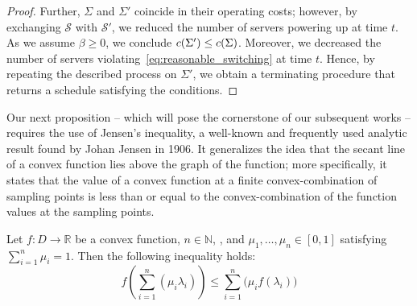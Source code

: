 \begin{proof}
Further, $\Sigma$ and $\Sigma'$ coincide in their operating costs; however, by exchanging $\mathcal{S}$ with $\mathcal{S}'$, we reduced the number of servers powering up at time $t$. As we assume $\beta\ge0$, we conclude $c(\Sigma')\le c(\Sigma)$. Moreover, we decreased the number of servers violating~\eqref{eq:reasonable_switching} at time $t$. Hence, by repeating the described process on $\Sigma'$, we obtain a terminating procedure that returns a schedule satisfying the conditions.
\end{proof}

Our next proposition -- which will pose the cornerstone of our subsequent works -- requires the use of Jensen's inequality, a well-known and frequently used analytic result found by Johan Jensen in 1906. It generalizes the idea that the secant line of a convex function lies above the graph of the function; more specifically, it states that the value of a convex function at a finite convex-combination of sampling points is less than or equal to the convex-combination of the function values at the sampling points.
\begin{lem}\label{lem:jensens-inequality}
Let $f:D\rightarrow\mathbb{R}$ be a convex function, $n\in\mathbb{N}$, , and $\mu_1,\dotsc,\mu_n\in[0,1]$ satisfying $\sum\limits_{i=1}^{n}\mu_i=1$. Then the following inequality holds:
\begin{equation*}
	f\left(\sum_{i=1}^n(\mu_i \lambda_i)\right) \le \sum_{i=1}^n\bigl(\mu_i f(\lambda_i)\bigr)
\end{equation*}
\end{lem}
